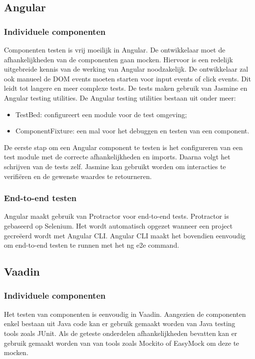 \subsection{Angular}
\subsubsection{Individuele componenten}
Componenten testen is vrij moeilijk in Angular. De ontwikkelaar moet de afhankelijkheden van de componenten gaan mocken. Hiervoor is een redelijk uitgebreide kennis van de werking van Angular noodzakelijk. De ontwikkelaar zal ook manueel de DOM events moeten starten voor input events of click events. 
Dit leidt tot langere en meer complexe tests. De tests maken gebruik van Jasmine en  Angular testing utilities. De Angular testing utilities bestaan uit onder meer:
\begin{itemize}
	\item TestBed: configureert een module voor de test omgeving;
	\item ComponentFixture: een mal voor het debuggen en testen van een component.
\end{itemize}

De eerste stap om een Angular component te testen is het configureren van een test module met de correcte afhankelijkheden en imports.
Daarna volgt het schrijven van de tests zelf. Jasmine kan gebruikt worden om interacties te verifiëren en de gewenste waardes te retourneren. 

\subsubsection{End-to-end testen}
Angular maakt gebruik van Protractor voor end-to-end tests. Protractor is gebaseerd op Selenium. Het wordt automatisch opgezet wanneer een project gecreëerd wordt met Angular CLI.
Angular CLI maakt het bovendien eenvoudig om end-to-end testen te runnen met het ng e2e command.

\subsection{Vaadin}
\subsubsection{Individuele componenten}
Het testen van componenten is eenvoudig in Vaadin. Aangezien de componenten enkel bestaan uit Java code kan er gebruik gemaakt worden van Java testing tools zoals JUnit. Als de geteste onderdelen afhankelijkheden bevatten kan er gebruik gemaakt worden van van tools zoals Mockito of EasyMock om deze te mocken. 

